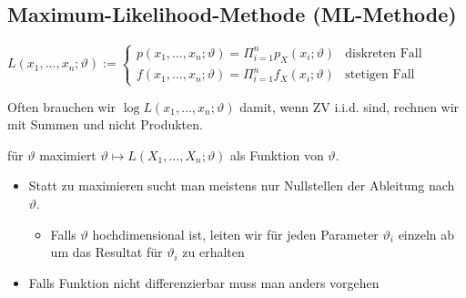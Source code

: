 \subsection{Maximum-Likelihood-Methode (ML-Methode)}
\begin{itemize}
     $L(x_1, \dots, x_n; \vartheta) :=
\begin{cases}
    p(x_1, \dots, x_n; \vartheta) = \Pi_{i = 1}^n p_X(x_i; \vartheta) &\text{diskreten Fall}\\
    f(x_1, \dots, x_n; \vartheta) = \Pi_{i = 1}^n f_X(x_i; \vartheta) &\text{stetigen Fall}
\end{cases}$
        \begin{itemize}
             Often brauchen wir $\log L(x_1, \dots, x_n;\vartheta)$ damit, wenn ZV i.i.d. sind, rechnen wir mit Summen und nicht Produkten.
        \end{itemize}
         für $\vartheta$ maximiert $\vartheta \mapsto L(X_1, \dots, X_n;\vartheta)$ als Funktion von $\vartheta$.
        \begin{itemize}
            \item Statt zu maximieren sucht man meistens nur Nullstellen der Ableitung nach $\vartheta$.
                \begin{itemize}
                    \item Falls $\vartheta$ hochdimensional ist, leiten wir für jeden Parameter $\vartheta_i$ einzeln ab um das Resultat für $\vartheta_i$ zu erhalten
                \end{itemize}
            \item Falls Funktion nicht differenzierbar muss man anders vorgehen
        \end{itemize}
\end{itemize}

